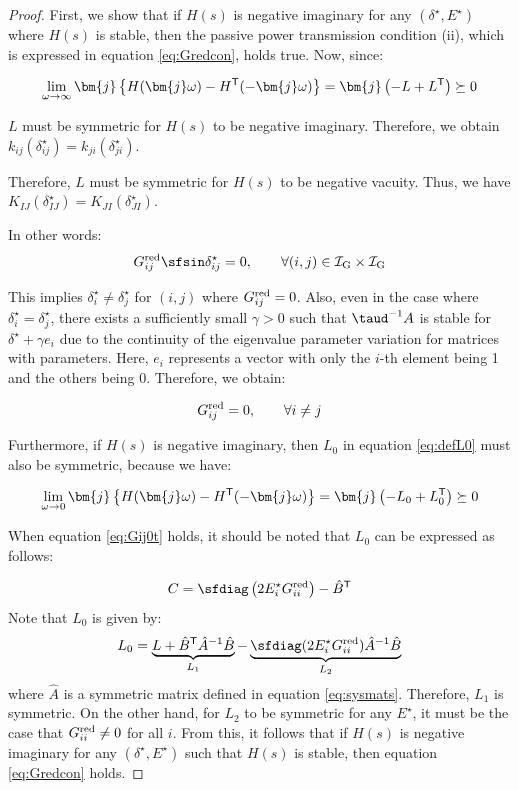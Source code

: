 \documentclass[graybox, envcountchap]{svmult}
\begin{document}
\begin{proof}
First, we show that if $H(s)$ is negative imaginary for any
$(\delta^{\star},E^{\star})$ where $H(s)$ is stable, then the passive power
transmission condition (ii), which is expressed in equation \ref{eq:Gredcon},
holds true. Now, since:

\[
  \lim_{\omega \rightarrow \infty} \bm{j}
  \left\{
  H(\bm{j}\omega)-H^{\sf T}(-\bm{j}\omega)
  \right\}
  =\bm{j}
  \left(
  -L+L^{\sf T}
  \right) \succeq 0
\]

$L$ must be symmetric for $H(s)$ to be negative imaginary. Therefore, we obtain
$k_{ij}(\delta_{ij}^{\star}) = k_{ji}(\delta_{ji}^{\star})$.

Therefore, $L$ must be symmetric for $H(s)$ to be negative vacuity.
Thus, we have $K_{IJ}(\delta_{IJ}^{\star}) = K_{JI}(\delta_{JI}^{\star})$.

In other words:
\[
  G^{\rm red}_{ij} \sfsin \delta_{ij}^{\star} = 0 ,\qquad
  \forall (i, j) \in \mathcal{I}_{\rm G} \times \mathcal{I}_{\rm G}
\]

This implies $\delta_{i}^{\star}\neq \delta_{j}^{\star}$ for $(i,j)$ where
$G^{\rm red}_{ij}=0$. Also, even in the case where $\delta_{i}^{\star}=
\delta_{j}^{\star}$, there exists a sufficiently small $\gamma>0$ such that
$\taud^{-1}A$ is stable for $\delta^{\star}+\gamma e_i$ due to the continuity of
the eigenvalue parameter variation for matrices with parameters. Here, $e_i$
represents a vector with only the $i$-th element being 1 and the others being 0.
Therefore, we obtain:

\begin{equation}\label{eq:Gij0t}
  G^{\rm red}_{ij}=0, \qquad
  \forall i\neq j
\end{equation}

Furthermore, if $H(s)$ is negative imaginary, then $L_0$ in equation
\ref{eq:defL0} must also be symmetric, because we have:

\[
  \lim_{\omega \rightarrow 0} \bm{j}
  \left\{
  H(\bm{j}\omega)-H^{\sf T}(-\bm{j}\omega)
  \right\}
  =\bm{j}
  \left(
  -L_0+L_0^{\sf T}
  \right) \succeq 0
\]

When equation \ref{eq:Gij0t} holds, it should be noted that $L_0$ can be
expressed as follows:

\[
  C = \sfdiag \left(
  2E_i^{\star} G^{\rm red}_{ii}
  \right)  - \hat{B}^{\sf T}
  \]
  Note that $L_0$ is given by:
  \[
  L_0 = \underbrace{ L + \hat{B}^{\sf T} \hat{A}^{-1} \hat{B} }_{L_1}
  -
  \underbrace{ \sfdiag (
  2 E_i^{\star} G^{\rm red}_{ii}
  ) \hat{A}^{-1} \hat{B}
  }_{L_2}
\]
where $\hat{A}$ is a symmetric matrix defined in equation \ref{eq:sysmats}.
Therefore, $L_1$ is symmetric. On the other hand, for $L_2$ to be symmetric for
any $E^{\star}$, it must be the case that $G^{\rm red}_{ii} \neq 0$ for all $i$.
From this, it follows that if $H(s)$ is negative imaginary for any
$(\delta^{\star},E^{\star})$ such that $H(s)$ is stable, then equation
\ref{eq:Gredcon} holds.


\end{proof}
\end{document}

